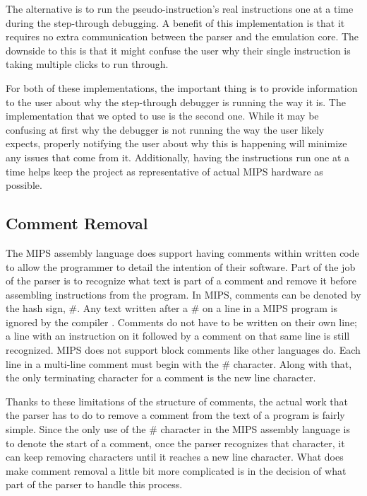 \documentclass[parskip=half, fontsize=12pt]{scrartcl}
\begin{document}
The alternative is to run the pseudo-instruction's real instructions one
at a time during the step-through debugging. A benefit of this
implementation is that it requires no extra communication between the
parser and the emulation core. The downside to this is that it might
confuse the user why their single instruction is taking multiple clicks
to run through.

For both of these implementations, the important thing is to provide
information to the user about why the step-through debugger is running
the way it is. The implementation that we opted to use is the second
one. While it may be confusing at first why the debugger is not running
the way the user likely expects, properly notifying the user about why
this is happening will minimize any issues that come from it.
Additionally, having the instructions run one at a time helps keep the
project as representative of actual MIPS hardware as possible.

\subsection{Comment Removal}

The MIPS assembly language does support having comments within written
code to allow the programmer to detail the intention of their software.
Part of the job of the parser is to recognize what text is part of a
comment and remove it before assembling instructions from the program.
In MIPS, comments can be denoted by the hash sign, \#. Any text written
after a \# on a line in a MIPS program is ignored by the compiler \cite{wikibooks-mips-instructions}.
Comments do not have to be written on their own line; a line with an
instruction on it followed by a comment on that same line is still
recognized. MIPS does not support block comments like other languages
do. Each line in a multi-line comment must begin with the \# character.
Along with that, the only terminating character for a comment is the new
line character.

Thanks to these limitations of the structure of comments, the actual
work that the parser has to do to remove a comment from the text of a
program is fairly simple. Since the only use of the \# character in the
MIPS assembly language is to denote the start of a comment, once the
parser recognizes that character, it can keep removing characters until
it reaches a new line character. What does make comment removal a little
bit more complicated is in the decision of what part of the parser to
handle this process.
\end{document}
